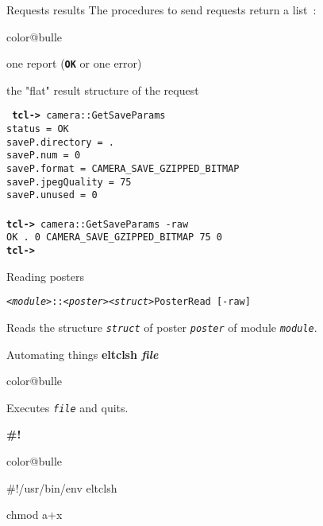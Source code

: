 \documentclass[a4paper,landscape,smooth]{show}
\begin{document}

\begin{tslide}{Requests results}
   \vfill
   The procedures to send requests return a list~:
   \begin{bitemize}{color@bulle}
      \item one report ({\bfseries\tt OK} or one error)
      \item the "flat" result structure of the request
   \end{bitemize}
   \vfill
   {\tt
   {\bf tcl->} camera::GetSaveParams \\
   status = OK\\
   saveP.directory = .\\
   saveP.num = 0\\
   saveP.format = CAMERA\_SAVE\_GZIPPED\_BITMAP\\
   saveP.jpegQuality = 75\\
   saveP.unused = 0\\
\\
   {\bf tcl->} camera::GetSaveParams -raw\\
   OK . 0 CAMERA\_SAVE\_GZIPPED\_BITMAP 75 0\\
   {\bf tcl->}}
   \vfill
\end{tslide}


\begin{tslide}{Reading posters}
   \vfill
   \begin{cartouche}
      \tt {\em <module>}::{\em <poster>}{\em <struct>}PosterRead [-raw]
   \end{cartouche}
   Reads the structure {\tt\em struct} of poster {\tt\em poster} of module
   {\tt\em module}.
   \vfill
\end{tslide}



\begin{tslide}{Automating things}
   \vfill
   {\bf eltclsh {\em file}}
   \begin{bitemize}{color@bulle}
      \item Executes {\tt\em file} and quits.
   \end{bitemize}
   \vfill
   {\bf \#!}
   \begin{bitemize}{color@bulle}
      \item \#!/usr/bin/env eltclsh
      \item chmod a+x
   \end{bitemize}
   \vfill
\end{tslide}

\vfill\eject\null\vfill\eject
\end{document}
